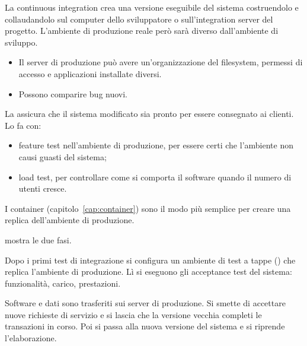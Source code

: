 La continuous integration crea una versione eseguibile del sistema costruendolo e collaudandolo sul computer dello
sviluppatore o sull'integration server del progetto. L'ambiente di produzione reale però sarà diverso dall'ambiente di
sviluppo.
\begin{itemize}
  \item Il server di produzione può avere un'organizzazione del filesystem, permessi di accesso e applicazioni
    installate diversi.
  \item Possono comparire bug nuovi.
\end{itemize}

La  assicura che il sistema modificato sia pronto per essere consegnato ai clienti. Lo fa
con:
\begin{itemize}
  \item feature test nell'ambiente di produzione, per essere certi che l'ambiente non causi guasti del sistema;
  \item load test, per controllare come si comporta il software quando il numero di utenti cresce.
\end{itemize}
I container (capitolo~\ref{cap:container}) sono il modo più semplice per creare una replica dell'ambiente di
produzione.

 mostra le due fasi.
\begin{description}[leftmargin=0pt, style=unboxed]
  \item[Per consegnare (deliver).] Dopo i primi test di integrazione si configura un ambiente di test a tappe
    () che replica l'ambiente di produzione. Lì si eseguono gli acceptance test del sistema: funzionalità,
    carico, prestazioni.
  \item[Per distribuire (deploy).] Software e dati sono trasferiti sui server di produzione. Si smette di accettare
    nuove richieste di servizio e si lascia che la versione vecchia completi le transazioni in corso. Poi si passa alla
    nuova versione del sistema e si riprende l'elaborazione.
\end{description}


